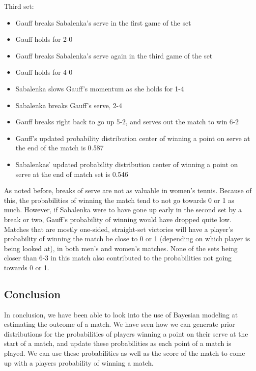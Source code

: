 \documentclass[
  letterpaper,
  DIV=11,
  numbers=noendperiod]{scrartcl}
\providecommand{\tightlist}{%
  \setlength{\itemsep}{0pt}\setlength{\parskip}{0pt}}\usepackage{longtable,booktabs,array}
\begin{document}
Third set:

\begin{itemize}
\tightlist
\item
  Gauff breaks Sabalenka's serve in the first game of the set
\item
  Gauff holds for 2-0
\item
  Gauff breaks Sabalenka's serve again in the third game of the set
\item
  Gauff holds for 4-0
\item
  Sabalenka slows Gauff's momentum as she holds for 1-4
\item
  Sabalenka breaks Gauff's serve, 2-4
\item
  Gauff breaks right back to go up 5-2, and serves out the match to win
  6-2
\item
  Gauff's updated probability distribution center of winning a point on
  serve at the end of the match is 0.587
\item
  Sabalenkas' updated probability distribution center of winning a point
  on serve at the end of match set is 0.546
\end{itemize}

As noted before, breaks of serve are not as valuable in women's tennis.
Because of this, the probabilities of winning the match tend to not go
towards 0 or 1 as much. However, if Sabalenka were to have gone up early
in the second set by a break or two, Gauff's probability of winning
would have dropped quite low. Matches that are mostly one-sided,
straight-set victories will have a player's probability of winning the
match be close to 0 or 1 (depending on which player is being looked at),
in both men's and women's matches. None of the sets being closer than
6-3 in this match also contributed to the probabilities not going
towards 0 or 1.

\subsection{Conclusion}\label{sec-conclusion}

In conclusion, we have been able to look into the use of Bayesian
modeling at estimating the outcome of a match. We have seen how we can
generate prior distributions for the probabilities of players winning a
point on their serve at the start of a match, and update these
probabilities as each point of a match is played. We can use these
probabilities as well as the score of the match to come up with a
players probability of winning a match.
\end{document}
